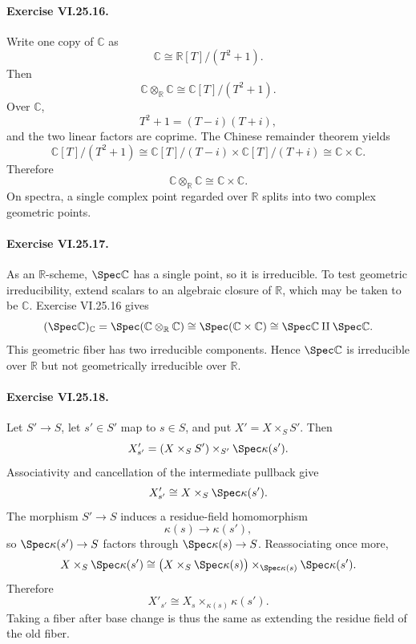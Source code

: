 \paragraph{Exercise VI.25.16.}
\begin{solution}
Write one copy of \(\mathbb C\) as
\[
\mathbb C\cong\mathbb R[T]/(T^2+1).
\]
Then
\[
\mathbb C\otimes_{\mathbb R}\mathbb C
\cong
\mathbb C[T]/(T^2+1).
\]
Over \(\mathbb C\),
\[
T^2+1=(T-i)(T+i),
\]
and the two linear factors are coprime.  The Chinese remainder theorem yields
\[
\mathbb C[T]/(T^2+1)
\cong
\mathbb C[T]/(T-i)\times\mathbb C[T]/(T+i)
\cong
\mathbb C\times\mathbb C.
\]
Therefore
\[
\mathbb C\otimes_{\mathbb R}\mathbb C\cong\mathbb C\times\mathbb C.
\]
On spectra, a single complex point regarded over \(\mathbb R\) splits into two complex geometric points.
\end{solution}

\paragraph{Exercise VI.25.17.}
\begin{solution}
As an \(\mathbb R\)-scheme, \(\Spec\mathbb C\) has a single point, so it is irreducible.  To test geometric irreducibility, extend scalars to an algebraic closure of \(\mathbb R\), which may be taken to be \(\mathbb C\).  Exercise VI.25.16 gives
\[
(\Spec\mathbb C)_{\mathbb C}
=
\Spec(\mathbb C\otimes_{\mathbb R}\mathbb C)
\cong
\Spec(\mathbb C\times\mathbb C)
\cong
\Spec\mathbb C\amalg\Spec\mathbb C.
\]
This geometric fiber has two irreducible components.  Hence \(\Spec\mathbb C\) is irreducible over \(\mathbb R\) but not geometrically irreducible over \(\mathbb R\).
\end{solution}

\paragraph{Exercise VI.25.18.}
\begin{solution}
Let \(S'\to S\), let \(s'\in S'\) map to \(s\in S\), and put \(X'=X\times_SS'\).  Then
\[
X'_{s'}
=
(X\times_SS')\times_{S'}\Spec\kappa(s').
\]
Associativity and cancellation of the intermediate pullback give
\[
X'_{s'}\cong X\times_S\Spec\kappa(s').
\]
The morphism \(S'\to S\) induces a residue-field homomorphism
\[
\kappa(s)\longrightarrow\kappa(s'),
\]
so \(\Spec\kappa(s')\to S\) factors through \(\Spec\kappa(s)\to S\).  Reassociating once more,
\[
X\times_S\Spec\kappa(s')
\cong
\bigl(X\times_S\Spec\kappa(s)\bigr)
\times_{\Spec\kappa(s)}
\Spec\kappa(s').
\]
Therefore
\[
\boxed{
X'_{s'}
\cong
X_s\times_{\kappa(s)}\kappa(s')
}.
\]
Taking a fiber after base change is thus the same as extending the residue field of the old fiber.
\end{solution}

